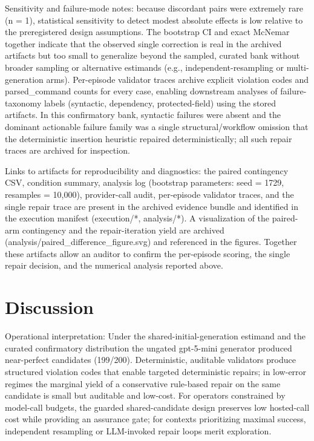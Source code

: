 \documentclass[conference]{IEEEtran}
\begin{document}
Sensitivity and failure-mode notes: because discordant pairs were extremely rare (n = 1), statistical sensitivity to detect modest absolute effects is low relative to the preregistered design assumptions. The bootstrap CI and exact McNemar together indicate that the observed single correction is real in the archived artifacts but too small to generalize beyond the sampled, curated bank without broader sampling or alternative estimands (e.g., independent-resampling or multi-generation arms). Per-episode validator traces archive explicit violation codes and parsed\_command counts for every case, enabling downstream analyses of failure-taxonomy labels (syntactic, dependency, protected-field) using the stored artifacts. In this confirmatory bank, syntactic failures were absent and the dominant actionable failure family was a single structural/workflow omission that the deterministic insertion heuristic repaired deterministically; all such repair traces are archived for inspection.

Links to artifacts for reproducibility and diagnostics: the paired contingency CSV, condition summary, analysis log (bootstrap parameters: seed = 1729, resamples = 10,000), provider-call audit, per-episode validator traces, and the single repair trace are present in the archived evidence bundle and identified in the execution manifest (execution/*, analysis/*). A visualization of the paired-arm contingency and the repair-iteration yield are archived (analysis/paired\_difference\_figure.svg) and referenced in the figures. Together these artifacts allow an auditor to confirm the per-episode scoring, the single repair decision, and the numerical analysis reported above.

\section{Discussion}
Operational interpretation: Under the shared-initial-generation estimand and the curated confirmatory distribution the ungated gpt-5-mini generator produced near-perfect candidates (199/200). Deterministic, auditable validators produce structured violation codes that enable targeted deterministic repairs; in low-error regimes the marginal yield of a conservative rule-based repair on the same candidate is small but auditable and low-cost. For operators constrained by model-call budgets, the guarded shared-candidate design preserves low hosted-call cost while providing an assurance gate; for contexts prioritizing maximal success, independent resampling or LLM-invoked repair loops merit exploration.
\end{document}
